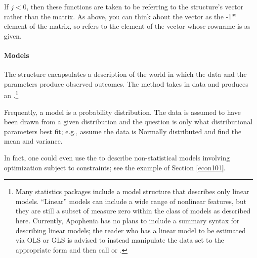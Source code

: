 If $j<0$, then these functions are taken to be referring to the
 structure's vector rather than the matrix. As
above, you can think about the vector as the -1$^{\rm{st}}$ element of the
matrix, so 
 refers to the
element of the vector whose rowname is as given.



\paragraph{Models}
The  structure encapsulates a description of the world
in which the data and the parameters produce observed outcomes. The
 method takes in data and
produces an .\footnote{Many statistics
packages include a model structure that describes only linear models.
``Linear'' models can include a wide range of nonlinear features, but
they are still a subset of measure zero within the class of models as
described here. Currently, Apophenia has no plans to include a summary
syntax for describing linear models; the reader who has a linear model
to be estimated via OLS or GLS is advised to instead manipulate the
data set to the appropriate form and then call 
or .}



Frequently, a model is a probability distribution. The data is assumed
to have been drawn from a given distribution and the question is
only what distributional parameters best fit; e.g., assume the data
is Normally distributed and find the mean and variance.

In fact, one could even use the  to describe 
non-statistical models involving optimization subject to constraints;
see the example of Section \ref{econ101}.

